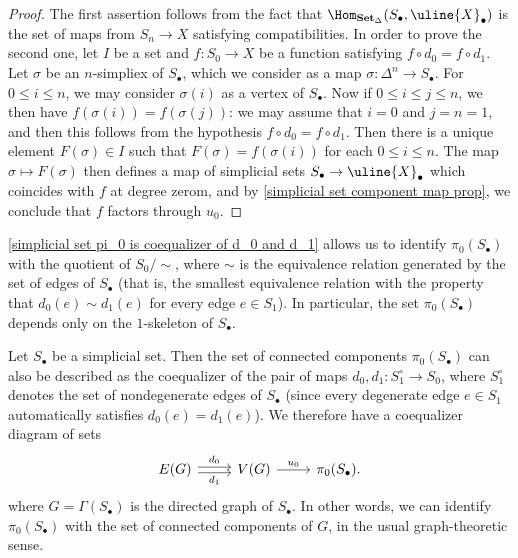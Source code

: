 \begin{proof}
The first assertion follows from the fact that $\Hom_{\mathbf{Set}_\Delta}(S_\bullet,\uline{X}_\bullet)$ is the set of maps from $S_n\to X$ satisfying compatibilities. In order to prove the second one, let $I$ be a set and $f:S_0\to X$ be a function satisfying $f\circ d_0=f\circ d_1$. Let $\sigma$ be an $n$-simpliex of $S_\bullet$, which we consider as a map $\sigma:\Delta^n\to S_\bullet$. For $0\leq i\leq n$, we may consider $\sigma(i)$ as a vertex of $S_\bullet$. Now if $0\leq i\leq j\leq n$, we then have $f(\sigma(i))=f(\sigma(j))$: we may assume that $i=0$ and $j=n=1$, and then this follows from the hypothesis $f\circ d_0=f\circ d_1$. Then there is a unique element $F(\sigma)\in I$ such that $F(\sigma)=f(\sigma(i))$ for each $0\leq i\leq n$. The map $\sigma\mapsto F(\sigma)$ then defines a map of simplicial sets $S_\bullet\to\uline{X}_\bullet$ which coincides with $f$ at degree zerom, and by \cref{simplicial set component map prop}, we conclude that $f$ factors through $u_0$.
\end{proof}
\begin{remark}\label{simplicial set pi_0 is quotient of d_0 and d_1 relation}
\cref{simplicial set pi_0 is coequalizer of d_0 and d_1} allows us to identify $\pi_0(S_\bullet)$ with the quotient of $S_0/\sim$, where $\sim$ is the equivalence relation generated by the set of edges of $S_\bullet$ (that is, the smallest equivalence relation with the property that $d_0(e)\sim d_1(e)$ for every edge $e\in S_1$). In particular, the set $\pi_0(S_\bullet)$ depends only on the $1$-skeleton of $S_\bullet$.
\end{remark}
\begin{remark}\label{simplicial set pi_0 is equivalent class of vertex}
Let $S_\bullet$ be a simplicial set. Then the set of connected components $\pi_0(S_\bullet)$ can also be described as the coequalizer of the pair of maps $d_0,d_1:S_1^{\circ}\to S_0$, where $S_1^{\circ}$ denotes the set of nondegenerate edges of $S_\bullet$ (since every degenerate edge $e\in S_1$ automatically satisfies $d_0(e)=d_1(e)$). We therefore have a coequalizer diagram of sets
\[\begin{tikzcd}
E(G)\ar[r,shift left=2pt,"d_0"]\ar[r,shift right=2pt,swap,"d_1"]&V(G)\ar[r,"u_0"]&\pi_0(S_\bullet).
\end{tikzcd}\]
where $G=\Gamma(S_\bullet)$ is the directed graph of $S_\bullet$. In other words, we can identify $\pi_0(S_\bullet)$ with the set of connected components of $G$, in the usual graph-theoretic sense. 
\end{remark}
